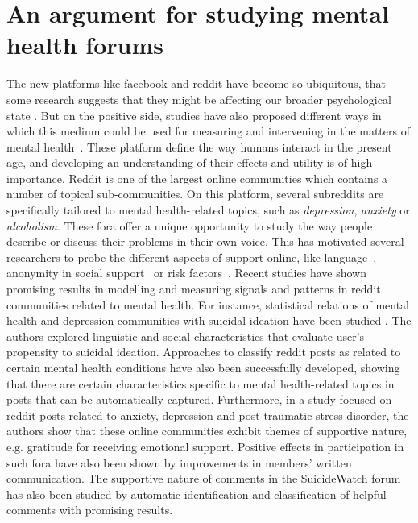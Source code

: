 \section{An argument for studying mental health forums}
The new platforms like facebook and reddit have become so ubiquitous, that some research suggests that they might be affecting our broader psychological state \cite{d20122}. But on the positive side, studies have also proposed different ways in which this medium could be used for measuring and intervening in the matters of mental health~\cite{DeChoudhury2016,DeChoudhury2014}. These platform define the way humans interact in the present age, and developing an understanding of their effects and utility is of high importance. Reddit is one of the largest online communities which contains a number of topical sub-communities. On this platform, several subreddits are specifically tailored to mental health-related topics, such as \emph{depression}, \emph{anxiety} or \emph{alcoholism}. These fora offer a unique opportunity to study the way people describe or discuss their problems in their own voice. This has motivated several researchers to probe the different aspects of support online, like language~\cite{languageChoudhury}, anonymity in social support~\cite{DeChoudhury2014} or risk factors~\cite{gkotsis2017characterisation}. Recent studies have shown promising results in modelling and measuring signals and patterns in reddit communities related to mental health. For instance, statistical relations of mental health and depression communities with suicidal ideation have been studied \cite{DeChoudhury2014,DeChoudhury2016}. The authors explored linguistic and social characteristics that evaluate user's propensity to suicidal ideation. Approaches to classify reddit posts as related to certain mental health conditions have also been successfully developed, showing that there are certain characteristics specific to mental health-related topics in posts that can be automatically captured\cite{gkotsis2017characterisation}. Furthermore, in a study focused on reddit posts related to anxiety, depression and post-traumatic stress disorder, the authors show that these online communities exhibit themes of supportive nature, e.g. gratitude for receiving emotional support\cite{park2018examining}. Positive effects in participation in such fora have also been shown by improvements in members' written communication\cite{info:doi/10.2196/jmir.8219}. The supportive nature of comments in the SuicideWatch forum has also been studied by automatic identification and classification of helpful comments with promising results\cite{Kavuluru:2016:CHC:2975167.2975170}.

